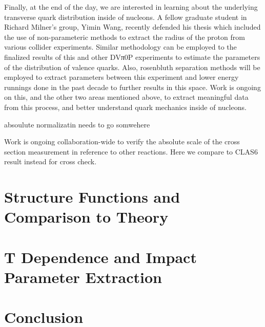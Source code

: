 Finally, at the end of the day, we are interested in learning about the underlying transverse quark distribution inside of
nucleons. A fellow graduate student in Richard Milner’s group, Yimin Wang, recently defended his thesis which included the
use of non-parameteric methods to extract the radius of the proton from various collider experiments. Similar methodology
can be employed to the finalized results of this and other DVπ0P experiments to estimate the parameters of the distribution
of valence quarks. Also, rosenbluth separation methods will be employed to extract parameters between this experiment and
lower energy runnings done in the past decade to further results in this space. Work is ongoing on this, and the other two areas
mentioned above, to extract meaningful data from this process, and better understand quark mechanics inside of nucleons.

absoulute normalizatin needs to go somwehere

Work is ongoing collaboration-wide to verify the absolute scale of the cross section measurement in reference to other reactions. Here we compare to CLAS6 result instead for cross check. 

\section{Structure Functions and Comparison to Theory}
    
    

\section{T Dependence and Impact Parameter Extraction}
    

%    

\section{Conclusion}
    











